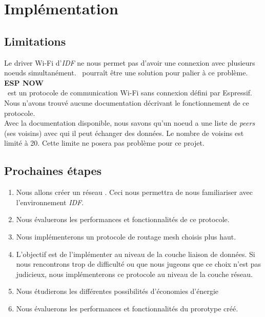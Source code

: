 \chapter{Implémentation}

\section{Limitations}
        Le driver Wi-Fi d'\textit{IDF} ne nous permet pas d'avoir une connexion
        avec plusieurs noeuds simultanément. \espnow\ pourraît être une solution
        pour palier à ce problème.\\
    
    
        \textbf{ESP NOW}\\
            \espnow\ est un protocole de communication Wi-Fi sans connexion défini
            par Espressif.\\ Nous n'avons trouvé aucune documentation décrivant le
            fonctionnement de ce protocole.\\
            Avec la documentation disponible, nous savons qu'un noeud a une liste
            de \textit{peers} (ses voisins) avec qui il peut échanger des données.
            Le nombre de voisins est limité à 20. Cette limite ne posera pas 
            problème pour ce projet.
        
\section{Prochaines étapes}
        \begin{enumerate}
            \item Nous allons créer un réseau \espmesh. Ceci nous permettra de nous
            familiariser avec l'environnement \textit{IDF}.
            \item Nous évaluerons les performances et fonctionnalités de ce protocole.
            \item Nous implémenterons un protocole de routage mesh choisis plus haut.
            \item L'objectif est de l'implémenter au niveau de la couche liaison de données.
                Si nous rencontrons trop de difficulté ou que nous jugeons que ce 
                choix n'est pas judicieux, nous implémenterons ce protocole au niveau 
                de la couche réseau.
            \item Nous étudierons les différentes possibilités d'économies d'énergie
            \item Nous évaluerons les performances et fonctionnalités du prorotype créé. 
            
        \end{enumerate}